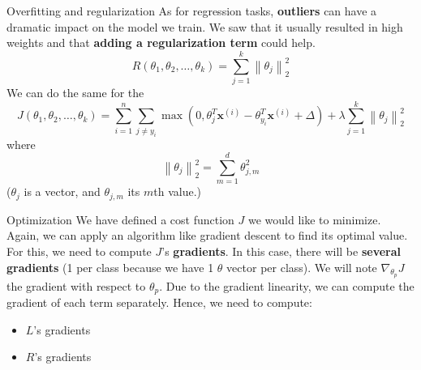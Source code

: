 \documentclass{beamer}
\newcommand{\1}[1]{\mathbbm{1}\left[#1\right]}
\newcommand{\norm}[1]{\left\lVert#1\right\rVert}
\newcommand{\bx}{\bm{x}}
\newcommand{\bxi}{\bx^{(i)}}
\newcommand{\pv}{\pause\vfill}
\begin{document}
\begin{frame}{Overfitting and regularization}
As for regression tasks, \textbf{outliers} can have a dramatic impact on the model we train. We saw that it usually resulted in high weights and that \textbf{adding a regularization term} could help.
\begin{equation*}
R(\theta_1, \theta_2, \dots, \theta_k) = \sum_{j = 1}^k \norm{\theta_j}_2^2
\end{equation*}
\pv
We can do the same for the 
\begin{equation*}
J(\theta_1, \theta_2, \dots, \theta_k) 
	= \sum_{i = 1}^n \sum_{j \neq y_i} 
	\max(0, \theta_j^T\bxi - \theta_{y_i}^T\bxi + \Delta)
	+ \lambda \sum_{j = 1}^k \norm{\theta_j}_2^2
\end{equation*}
where
\begin{equation*}
\norm{\theta_j}_2^2 = \sum_{m = 1}^d \theta_{j,m}^2
\end{equation*}
($\theta_j$ is a vector, and $\theta_{j,m}$ its $m$th value.)
\end{frame}

\begin{frame}{Optimization}
We have defined a cost function $J$ we would like to minimize. Again, we can apply an algorithm like gradient descent to find its optimal value. For this, we need to compute $J$'s \textbf{gradients}.
\pv
In this case, there will be \textbf{several gradients} (1 per class because we have 1 $\theta$ vector per class). We will note $\nabla_{\theta_p}J$ the gradient with respect to $\theta_p$.
\pv
Due to the gradient linearity, we can compute the gradient of each term separately. Hence, we need to compute:
\begin{itemize}
	\item $L$'s gradients
	\item $R$'s gradients
\end{itemize}
\end{frame}
\end{document}
